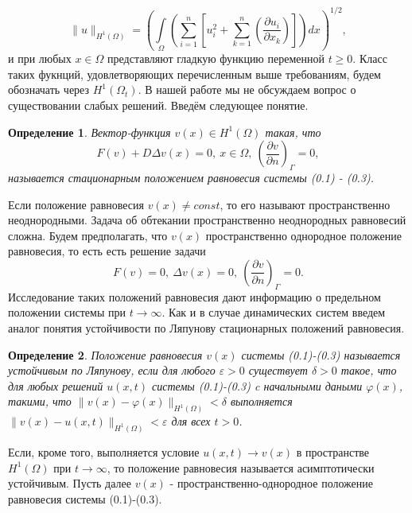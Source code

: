 \documentclass[9pt, a4paper]{extarticle}
\newtheorem{definition}{Определение}
\numberwithin{equation}{section}
\numberwithin{lemma}{section}
\numberwithin{definition}{section}
\numberwithin{notabene}{section}
\numberwithin{corollary}{section}
\begin{document}
	\begin{equation*}
		\|u\|_{H^1(\Omega)} = \left( \int\limits_{\Omega} \left(\sum\limits_{i=1}^{n} \left[u_i^2+\sum\limits_{k=1}^{n} \left(\dfrac{\partial u_i}{\partial x_k}\right)\right]\right) dx\right)^{1/2}, 
	\end{equation*}
	и при любых $x \in \Omega$ представляют гладкую функцию переменной $t \geq 0$.\newline
	Класс таких фукнций, удовлетворяющих перечисленным выше требованиям, будем обозначать через $H^1(\Omega_t)$. В нашей работе мы не обсуждаем вопрос о существовании слабых решений. \newline
	Введём следующее понятие.
	\begin{definition}
		Вектор-функция $v(x) \in H^1(\Omega)$ такая, что 
		\begin{equation}
			F(v) + D \Delta v(x) = 0, \ x \in \Omega, \ \left(\dfrac{\partial v}{\partial n}\right)_\Gamma = 0, 
		\end{equation}
		называется стационарным положением равновесия системы (0.1) - (0.3).
	\end{definition}
	Если положение равновесия $v(x) \neq const$, то его называют пространственно неоднородными. Задача об обтекании пространственно неоднородных равновесий сложна. Будем предполагать, что $v(x)$ пространственно однородное положение равновесия, то есть есть решение задачи
	\begin{equation*}
		F(v) = 0, \ \Delta v(x) = 0, \ \left(\dfrac{\partial v}{\partial n}\right)_\Gamma = 0.
	\end{equation*}
	Исследование таких положений равновесия дают информацию о предельном положении системы при $t \to \infty$. Как и в случае динамических систем введем аналог понятия устойчивости по Ляпунову стационарных положений равновесия.
	\begin{definition}
		Положение равновесия $v(x)$ системы (0.1)-(0.3) называется устойчивым по Ляпунову, если для любого $\varepsilon > 0$ существует $\delta > 0$ такое, что для любых решений $u(x,t)$ системы (0.1)-(0.3) c начальными даными $\varphi(x)$, такими, что $\|v(x) - \varphi(x)\|_{H^1(\Omega)} < \delta$ выполняется $\|v(x) - u(x,t)\|_{H^1(\Omega)} < \varepsilon$ для всех $t > 0$.
	\end{definition}
	Если, кроме того, выполняется условие $u(x,t) \to v(x)$ в пространстве $H^1(\Omega)$ при $t \to \infty$, то положение равновесия называется асимптотически устойчивым.\newline
	Пусть далее $v(x)$ - пространственно-однородное положение равновесия системы (0.1)-(0.3). \newline
\end{document}
